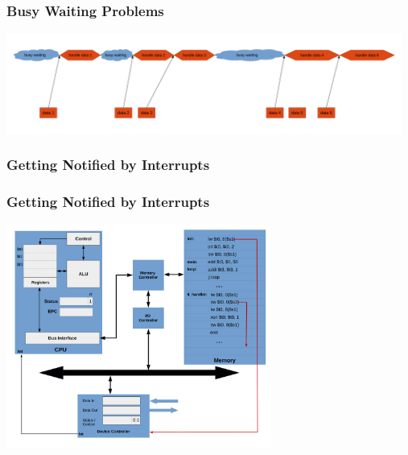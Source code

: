 \documentclass{beamer}
\begin{document}
\begin{frame}[fragile]
\frametitle{Busy Waiting Problems}

\begin{center}
\vspace*{-0.2cm}
\hspace*{-1cm}\includegraphics[width=13cm]{busy_waiting_problem1.pdf}
\end{center}

\end{frame}

\begin{frame}[fragile]
\frametitle{Getting Notified by Interrupts}


\end{frame}

\begin{frame}[fragile]
\frametitle{Getting Notified by Interrupts}

\begin{center}
\vspace*{-0.23cm}
\hspace*{-1cm}\includegraphics[width=8.7cm]{interrupt_waiting1.pdf}
\end{center}

\end{frame}
\end{document}

